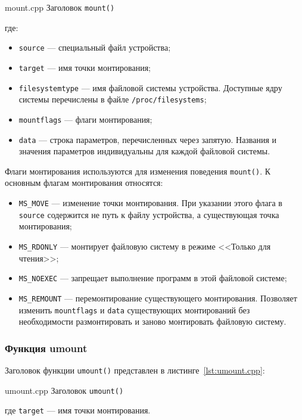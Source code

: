     {mount.cpp}
    {Заголовок \texttt{mount()}}

где:

\begin{itemize}[label=---]
    \item \texttt{source} --- специальный файл устройства;
    \item \texttt{target} --- имя точки монтирования;
    \item \texttt{filesystemtype} --- имя файловой системы устройства. Доступные ядру системы перечислены в файле \texttt{/proc/filesystems};
    \item \texttt{mountflags} --- флаги монтирования;
    \item \texttt{data} --- строка параметров, перечисленных через запятую. Названия и значения параметров 
    индивидуальны для каждой файловой системы.
\end{itemize}

Флаги монтирования используются для изменения поведения \texttt{mount()}.
К основным флагам монтирования относятся:

\begin{itemize}[label=---]
    \item \texttt{MS\_MOVE} --- изменение точки монтирования. При указании этого флага в \texttt{source}
    содержится не путь к файлу устройства, а существующая точка монтирования;
    \item \texttt{MS\_RDONLY} --- монтирует файловую систему в режиме <<Только для чтения>>;
    \item \texttt{MS\_NOEXEC} --- запрещает выполнение программ в этой файловой системе;
    \item \texttt{MS\_REMOUNT} --- перемонтирование существующего монтирования. Позволяет изменить 
    \texttt{mountflags} и \texttt{data} существующих монтирований без необходимости размонтировать и заново 
    монтировать файловую систему.
\end{itemize}

\subsubsection{Функция umount}

Заголовок функции \texttt{umount()} представлен в листинге~\ref{lst:umount.cpp}: 

    {umount.cpp}
    {Заголовок \texttt{umount()}}

где \texttt{target} --- имя точки монтирования.

